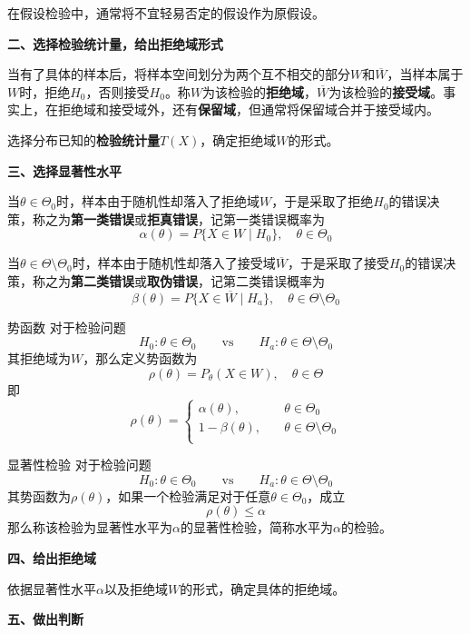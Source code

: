\documentclass[lang = cn, scheme = chinese, thmcnt = section]{elegantbook}
\begin{document}
在假设检验中，通常将不宜轻易否定的假设作为原假设。

\textbf{二、选择检验统计量，给出拒绝域形式}

当有了具体的样本后，将样本空间划分为两个互不相交的部分$W$和$\overline{W}$，当样本属于$W$时，拒绝$H_0$，否则接受$H_0$。称$W$为该检验的\textbf{拒绝域}，$\overline{W}$为该检验的\textbf{接受域}。事实上，在拒绝域和接受域外，还有\textbf{保留域}，但通常将保留域合并于接受域内。

选择分布已知的\textbf{检验统计量}$T(X)$，确定拒绝域$W$的形式。

\textbf{三、选择显著性水平}

当$\theta\in\Theta_0$时，样本由于随机性却落入了拒绝域$W$，于是采取了拒绝$H_0$的错误决策，称之为\textbf{第一类错误}或\textbf{拒真错误}，记第一类错误概率为
$$
\alpha(\theta)=P\{X\in W\mid H_0\},\quad \theta\in\Theta_0
$$

当$\theta\in\Theta\setminus\Theta_0$时，样本由于随机性却落入了接受域$\overline{W}$，于是采取了接受$H_0$的错误决策，称之为\textbf{第二类错误}或\textbf{取伪错误}，记第二类错误概率为
$$
\beta(\theta)=P\{X\in \overline{W}\mid H_a\},\quad \theta\in\Theta\setminus\Theta_0
$$

\begin{definition}{势函数}
	对于检验问题
	$$
	H_0:\theta\in\Theta_0 \qquad
	\mathrm{vs}
	\qquad H_a:\theta\in\Theta\setminus\Theta_0
	$$
	其拒绝域为$W$，那么定义势函数为
	$$
	\rho(\theta)=P_{\theta}(X\in W),\quad \theta\in\Theta
	$$
	即
	$$
	\rho(\theta)=\begin{cases}
		\alpha(\theta),\quad & \theta\in\Theta_0\\
		1-\beta(\theta),\quad & \theta\in\Theta\setminus\Theta_0\\
	\end{cases}
	$$
\end{definition}

\begin{definition}{显著性检验}
	对于检验问题
	$$
	H_0:\theta\in\Theta_0 \qquad
	\mathrm{vs}
	\qquad H_a:\theta\in\Theta\setminus\Theta_0
	$$
	其势函数为$\rho(\theta)$，如果一个检验满足对于任意$\theta\in\Theta_0$，成立
	$$
	\rho(\theta)\le\alpha
	$$
	那么称该检验为显著性水平为$\alpha$的显著性检验，简称水平为$\alpha$的检验。
\end{definition}

\textbf{四、给出拒绝域}

依据显著性水平$\alpha$以及拒绝域$W$的形式，确定具体的拒绝域。

\textbf{五、做出判断}
\end{document}
